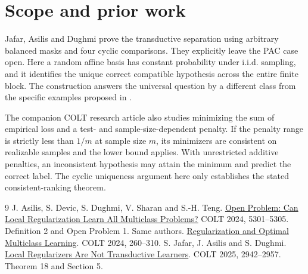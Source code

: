 \documentclass[11pt]{article}
\begin{document}
\section{Scope and prior work}
Jafar, Asilis and Dughmi \cite{trans} prove the transductive separation using arbitrary balanced masks and four cyclic comparisons. They explicitly leave the PAC case open. Here a random affine basis has constant probability under i.i.d. sampling, and it identifies the unique correct compatible hypothesis across the entire finite block. The construction answers the universal question by a different class from the specific examples proposed in \cite{open,trans}.

The companion COLT research article \cite{long} also studies minimizing the sum of empirical loss and a test- and sample-size-dependent penalty. If the penalty range is strictly less than $1/m$ at sample size $m$, its minimizers are consistent on realizable samples and the lower bound applies. With unrestricted additive penalties, an inconsistent hypothesis may attain the minimum and predict the correct label. The cyclic uniqueness argument here only establishes the stated consistent-ranking theorem.

\begin{thebibliography}{9}
 J. Asilis, S. Devic, S. Dughmi, V. Sharan and S.-H. Teng. \href{https://proceedings.mlr.press/v247/asilis24b.html}{Open Problem: Can Local Regularization Learn All Multiclass Problems?} COLT 2024, 5301--5305. Definition 2 and Open Problem 1.
 Same authors. \href{https://proceedings.mlr.press/v247/asilis24a.html}{Regularization and Optimal Multiclass Learning}. COLT 2024, 260--310.
 S. Jafar, J. Asilis and S. Dughmi. \href{https://proceedings.mlr.press/v291/jafar25a.html}{Local Regularizers Are Not Transductive Learners}. COLT 2025, 2942--2957. Theorem 18 and Section 5.
\end{thebibliography}
\end{document}
